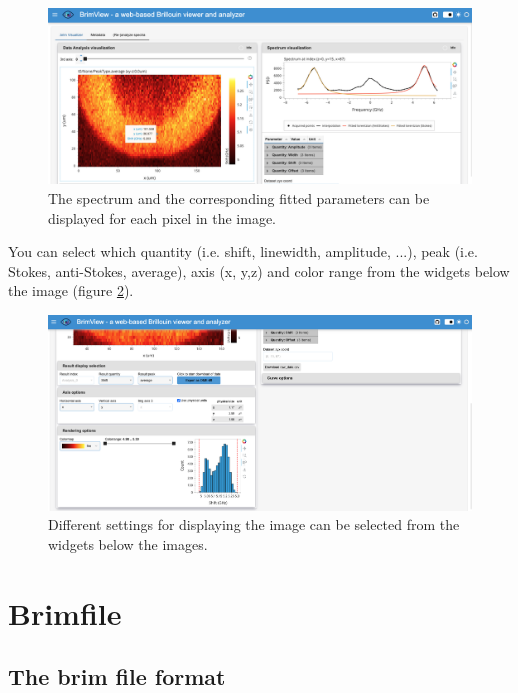 \documentclass{article}
\begin{document}
\begin{figure}[H]
    \centering
    \includegraphics[width=\textwidth]{img/brimview-spectrum.png}
    \caption{The spectrum and the corresponding fitted parameters can be displayed for each pixel in the image.}
    \label{fig:brimview-spectrum}
\end{figure}

You can select which quantity (i.e. shift, linewidth, amplitude, ...), peak (i.e. Stokes, anti-Stokes, average), axis (x, y,z) and color range from the widgets below the image (figure \ref{fig:brimview-parameters}).

\begin{figure}[H]
    \centering
    \includegraphics[width=\textwidth]{img/brimview-parameters.png}
    \caption{Different settings for displaying the image can be selected from the widgets below the images.}
    \label{fig:brimview-parameters}
\end{figure}

\section{Brimfile}

\subsection{The brim file format}
\end{document}
